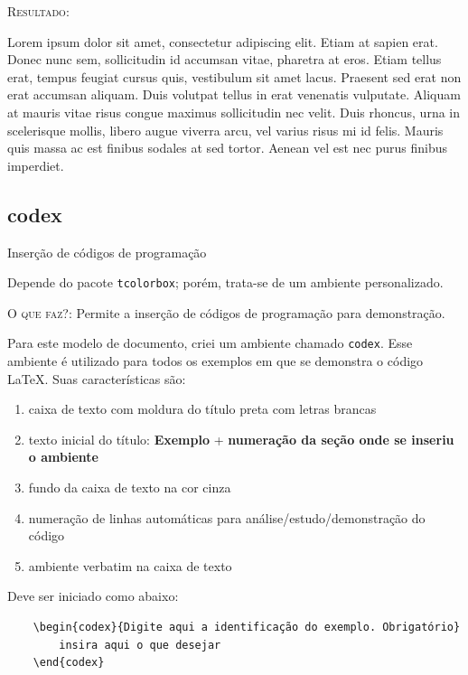 \documentclass[a4paper,12pt,oneside,openright,extrafontsizes,openbib]{memoir}
\begin{document}
{\textsc{Resultado:}

\begin{citel}
	Lorem ipsum dolor sit amet, consectetur adipiscing elit. Etiam at sapien erat. Donec nunc sem, sollicitudin id accumsan vitae, pharetra at eros. Etiam tellus erat, tempus feugiat cursus quis, vestibulum sit amet lacus. Praesent sed erat non erat accumsan aliquam. Duis volutpat tellus in erat venenatis vulputate. Aliquam at mauris vitae risus congue maximus sollicitudin nec velit. Duis rhoncus, urna in scelerisque mollis, libero augue viverra arcu, vel varius risus mi id felis. Mauris quis massa ac est finibus sodales at sed tortor. Aenean vel est nec purus finibus imperdiet.
\end{citel}

\subsection{codex}{Inserção de códigos de programação}

Depende do pacote \verb|tcolorbox|; porém, trata-se de um ambiente personalizado.

\textsc{O que faz?}: Permite a inserção de códigos de programação para demonstração.

Para este modelo de documento, criei um ambiente chamado \verb|codex|. Esse ambiente é utilizado para todos os exemplos em que se demonstra o código \LaTeX. Suas características são:

\begin{enumerate}
	\item caixa de texto com moldura do título preta com letras brancas
	\item texto inicial do título: \textbf{Exemplo} + \textbf{numeração da seção onde se inseriu o ambiente}
	\item fundo da caixa de texto na cor cinza
	\item numeração de linhas automáticas para análise/estudo/demonstração do código
	\item ambiente verbatim na caixa de texto
\end{enumerate} 

Deve ser iniciado como abaixo:

\begin{verbatim}
	\begin{codex}{Digite aqui a identificação do exemplo. Obrigatório}
		insira aqui o que desejar
	\end{codex}
\end{verbatim}

}
\end{document}
